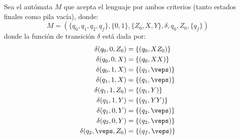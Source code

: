 \documentclass[12pt]{article}
\begin{document}
\begin{ejercicio}[2.5 puntos]
\begin{enumerate}
            Sea el autómata $M$ que acepta el lenguaje por ambos criterios (tanto estados finales como pila vacía), donde:
            \begin{equation*}
                M=(\{q_0,q_1,q_2,q_f\},\{0,1\},\{Z_0,X,Y\},\delta,q_0,Z_0,\{q_f\})
            \end{equation*}
            donde la función de transición $\delta$ está dada por:
            \begin{align*}
                \delta(q_0,0,Z_0)&=\{(q_0,XZ_0)\}\\
                \delta(q_0,0,X)&=\{(q_0,XX)\}\\
                \delta(q_0,1,X)&=\{(q_1,\veps)\}\\
                \delta(q_1,1,X)&=\{(q_1,\veps)\}\\
                \delta(q_1,1,Z_0)&=\{(q_1,Y)\}\\
                \delta(q_1,1,Y)&=\{(q_1,YY)\}\\
                \delta(q_1,0,Y)&=\{(q_2,\veps)\}\\
                \delta(q_2,0,Y)&=\{(q_2,\veps)\}\\
                \delta(q_2,\veps,Z_0)&=\{(q_f,\veps)\}
            \end{align*}
        \end{enumerate}
    \end{ejercicio}
\end{document}
